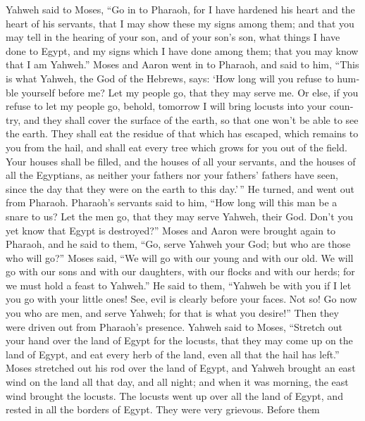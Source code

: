 \begin{paracol}{2}
\begin{otherlanguage}{english}
 Yahweh said to Moses, ``Go in to Pharaoh, for I have
hardened his heart and the heart of his servants, that I may show these
my signs among them;  and that you may tell in the hearing
of your son, and of your son's son, what things I have done to Egypt,
and my signs which I have done among them; that you may know that I am
Yahweh.''  Moses and Aaron went in to Pharaoh, and said to
him, ``This is what Yahweh, the God of the Hebrews, says: `How long will
you refuse to humble yourself before me? Let my people go, that they may
serve me.  Or else, if you refuse to let my people go,
behold, tomorrow I will bring locusts into your country, 
and they shall cover the surface of the earth, so that one won't be able
to see the earth. They shall eat the residue of that which has escaped,
which remains to you from the hail, and shall eat every tree which grows
for you out of the field.  Your houses shall be filled,
and the houses of all your servants, and the houses of all the
Egyptians, as neither your fathers nor your fathers' fathers have seen,
since the day that they were on the earth to this day.'\,'' He turned,
and went out from Pharaoh.  Pharaoh's servants said to
him, ``How long will this man be a snare to us? Let the men go, that
they may serve Yahweh, their God. Don't you yet know that Egypt is
destroyed?''  Moses and Aaron were brought again to
Pharaoh, and he said to them, ``Go, serve Yahweh your God; but who are
those who will go?''  Moses said, ``We will go with our
young and with our old. We will go with our sons and with our daughters,
with our flocks and with our herds; for we must hold a feast to
Yahweh.''  He said to them, ``Yahweh be with you if I let
you go with your little ones! See, evil is clearly before your faces.
 Not so! Go now you who are men, and serve Yahweh; for
that is what you desire!'' Then they were driven out from Pharaoh's
presence.  Yahweh said to Moses, ``Stretch out your hand
over the land of Egypt for the locusts, that they may come up on the
land of Egypt, and eat every herb of the land, even all that the hail
has left.''  Moses stretched out his rod over the land of
Egypt, and Yahweh brought an east wind on the land all that day, and all
night; and when it was morning, the east wind brought the locusts.
 The locusts went up over all the land of Egypt, and
rested in all the borders of Egypt. They were very grievous. Before them

\end{otherlanguage}
\end{paracol}
